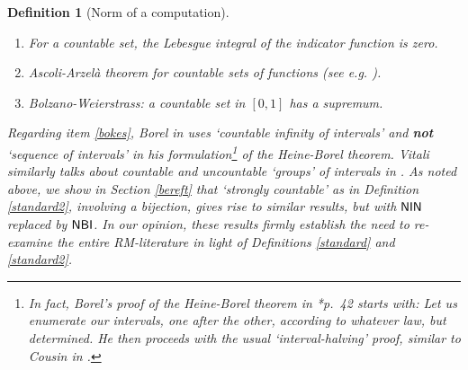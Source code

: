 \documentclass[reqno]{amsart}
\newtheorem{defi}[thm]{Definition}
\def\NBI{\textup{\textsf{NBI}}}
\def\NIN{\textup{\textsf{NIN}}}
\numberwithin{equation}{section}
\numberwithin{thm}{section}
\begin{document}
\begin{defi}[Norm of a computation]
\begin{enumerate}
\item For a countable set, the Lebesgue integral of the indicator function is zero.
\item Ascoli-Arzel\`a theorem for countable sets of functions (see e.g. \cite{fourchette}).
\item Bolzano-Weierstrass: a countable set in $[0,1]$ has a supremum.\label{bokes3}
\end{enumerate}
Regarding item \eqref{bokes}, Borel in \cite{opborrelen2} uses `countable infinity of intervals' and \textbf{not} `sequence of intervals' in his formulation\footnote{In fact, Borel's proof of the Heine-Borel theorem in \cite{opborrelen2}*{p.\ 42} starts with: \emph{Let us enumerate our intervals, one after the other, according to whatever law, but determined}.  He then proceeds with the usual `interval-halving' proof, similar to Cousin in \cite{cousin1}.} of the Heine-Borel theorem.  
Vitali similarly talks about countable and uncountable `groups' of intervals in \cite{vitaliorg}.  As noted above, we show in Section \ref{bereft} that `strongly countable' as in Definition \ref{standard2}, involving a bijection, gives rise to 
similar results, but with $\NIN$ replaced by $\NBI$.  In our opinion, these results firmly establish the need to re-examine the entire RM-literature in light of Definitions \ref{standard} and \ref{standard2}.

\smallskip


\end{defi}
\end{document}
